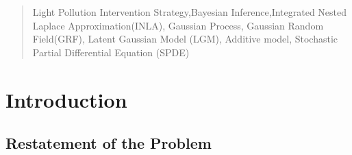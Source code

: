 \documentclass{mcmthesis}
\begin{document}
\begin{abstract}
\begin{keywords}
 Light Pollution Intervention Strategy,Bayesian Inference,Integrated Nested Laplace Approximation(INLA), Gaussian Process, Gaussian Random Field(GRF), Latent Gaussian Model (LGM), Additive model, Stochastic Partial Differential Equation (SPDE)

\end{keywords}
\end{abstract}
\maketitle
 \tableofcontents
 \newpage
\section{Introduction}
\subsection{Restatement of the Problem}
 
\end{document}
